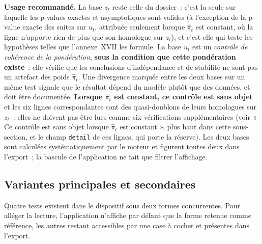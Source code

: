 \documentclass[a4paper,11pt]{article}
\newcommand{\code}[1]{\texttt{\small #1}}
\begin{document}
\medskip
\begin{encadre}
\textbf{Usage recommandé.} La base $z_t$ reste celle du dossier~: c'est la seule
sur laquelle les p-values exactes et asymptotiques sont valides (à l'exception
de la p-value exacte des suites sur $u_t$, attribuée seulement lorsque
$\hat\pi_t$ est constant, où la ligne n'apporte rien de plus que son homologue
sur $z_t$), et c'est elle
qui teste les hypothèses telles que l'annexe~XVII les formule. La base $u_t$ est
un \emph{contrôle de cohérence de la pondération}, \textbf{sous la condition
que cette pondération existe}~: elle vérifie que les conclusions
d'indépendance et de stabilité ne sont pas un artefact des poids $\hat\pi_t$.
Une divergence marquée entre les deux bases sur un même test
signale que le résultat dépend du modèle plutôt que des données, et doit être
documentée. \textbf{Lorsque $\hat\pi_t$ est constant, ce contrôle est sans
objet} et les six lignes correspondantes sont des quasi-doublons de leurs
homologues sur $z_t$~: elles ne doivent pas être lues comme six vérifications
supplémentaires (voir « Ce contrôle est sans objet lorsque $\hat\pi_t$ est
constant », plus haut dans cette sous-section, et le champ \code{detail} de ces
lignes, qui porte la réserve). Les deux bases sont calculées systématiquement par le moteur et
figurent toutes deux dans l'export~; la bascule de l'application ne fait que
filtrer l'affichage.
\end{encadre}

\subsection{Variantes principales et secondaires}
\label{sec:variantes}

Quatre tests existent dans le dispositif sous deux formes concurrentes. Pour
alléger la lecture, l'application n'affiche par défaut que la forme retenue
comme référence, les autres restant accessibles par une case à cocher et
présentes dans l'export.
\end{document}

